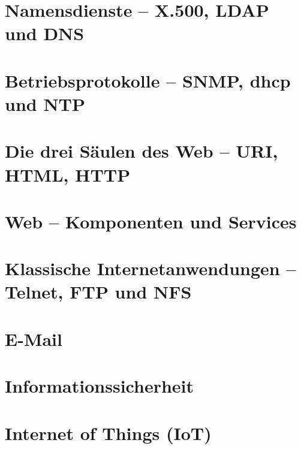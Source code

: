 \documentclass[hidelinks]{article}
\begin{document}
\section{Namensdienste -- X.500, LDAP und DNS}

\section{Betriebsprotokolle -- SNMP, dhcp und NTP}

\section{Die drei Säulen des Web -- URI, HTML, HTTP}

\section{Web -- Komponenten und Services}

\section{Klassische Internetanwendungen -- Telnet, FTP und NFS}

\section{E-Mail}

\section{Informationssicherheit}

\section{Internet of Things (IoT)}
\end{document}
